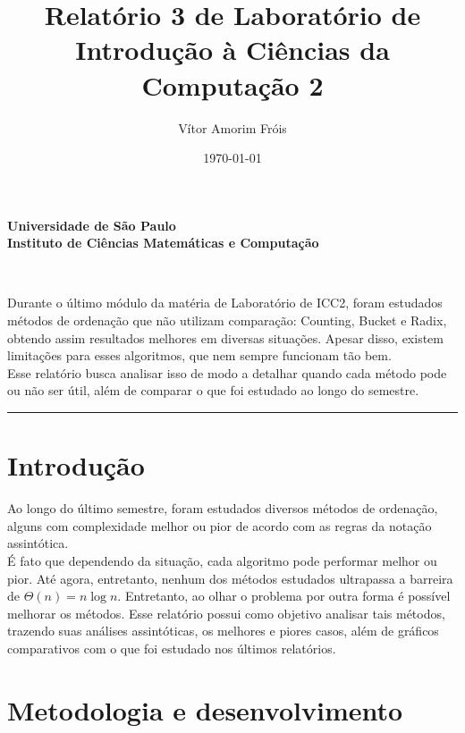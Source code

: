 \documentclass[fontsize=11pt]{article}
\title{
\Large{Relatório 3 de Laboratório de Introdução à Ciências da Computação 2}\\
[10pt] 
}
\author{Vítor Amorim Fróis}
\date{\today}
\makeatletter
\renewenvironment{abstract} %
  {\small
  \begin{center}
  \bfseries \abstractname\vspace{-.5em}\vspace{0pt}
  \end{center}
  \list{}{%
    \setlength{\leftmargin}{0mm}
    \setlength{\rightmargin}{\leftmargin}%
  }
  \item\relax}
 {\endlist}
\renewcommand{\maketitle}{\bgroup\setlength{\parindent}{0pt}%
\begin{center}
    \textbf{
      Universidade de São Paulo\\
      Instituto de Ciências Matemáticas e Computação
    }
\end{center}
\begin{flushleft}
  \textbf{\@title}
  \@author\\
  [3pt] 
  \@date
\end{flushleft}\egroup
}
\makeatother
\begin{document}
\maketitle

\begin{abstract}
    Durante o último módulo da matéria de Laboratório de ICC2, foram estudados métodos
    de ordenação que não utilizam comparação: Counting, Bucket e Radix, obtendo assim resultados melhores em diversas 
    situações. Apesar disso, existem limitações para esses algoritmos, que nem sempre funcionam tão bem.
    \\ Esse relatório busca analisar isso de modo a detalhar quando cada método pode ou não ser útil,
    além de comparar o que foi estudado ao longo do semestre.
\end{abstract}

\rule{\linewidth}{0.2pt}

\section{Introdução}
    Ao longo do último semestre, foram estudados diversos métodos de ordenação,
    alguns com complexidade melhor ou pior de acordo com as regras da 
    notação assintótica. \\
    É fato que dependendo da situação, cada algoritmo
    pode performar melhor ou pior. Até agora, entretanto, nenhum dos métodos
    estudados ultrapassa a barreira de $\Theta (n) = n \log n$. Entretanto, ao
    olhar o problema por outra forma é possível melhorar os métodos.
    Esse relatório possui como objetivo analisar tais métodos, trazendo suas análises 
    assintóticas, os melhores e piores casos, além de gráficos comparativos com o que 
    foi estudado nos últimos relatórios.

\section{Metodologia e desenvolvimento}
\end{document}

